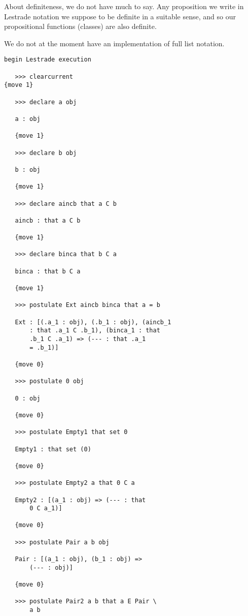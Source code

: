 \documentclass[12pt]{article}
\begin{document}
\begin{enumerate}
\begin{description}
\end{description}

About definiteness, we do not have much to say.  Any proposition we write in Lestrade notation we suppose to be definite in a suitable sense, and so our propositional functions (classes) are also definite.

We do not at the moment have an implementation of full list notation.

\begin{verbatim}
begin Lestrade execution

   >>> clearcurrent
{move 1}

   >>> declare a obj

   a : obj

   {move 1}

   >>> declare b obj

   b : obj

   {move 1}

   >>> declare aincb that a C b

   aincb : that a C b

   {move 1}

   >>> declare binca that b C a

   binca : that b C a

   {move 1}

   >>> postulate Ext aincb binca that a = b

   Ext : [(.a_1 : obj), (.b_1 : obj), (aincb_1 
       : that .a_1 C .b_1), (binca_1 : that 
       .b_1 C .a_1) => (--- : that .a_1 
       = .b_1)]

   {move 0}

   >>> postulate 0 obj

   0 : obj

   {move 0}

   >>> postulate Empty1 that set 0

   Empty1 : that set (0)

   {move 0}

   >>> postulate Empty2 a that 0 C a

   Empty2 : [(a_1 : obj) => (--- : that 
       0 C a_1)]

   {move 0}

   >>> postulate Pair a b obj

   Pair : [(a_1 : obj), (b_1 : obj) => 
       (--- : obj)]

   {move 0}

   >>> postulate Pair2 a b that a E Pair \
       a b


\end{verbatim}
\end{enumerate}
\end{document}
